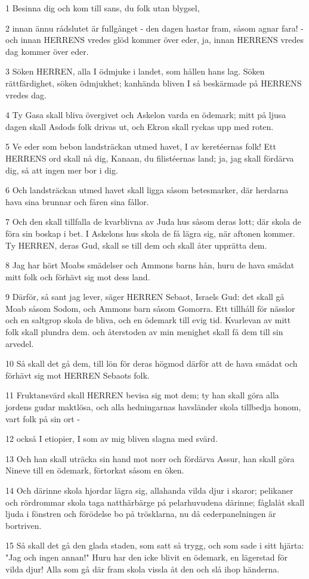 \par 1 Besinna dig och kom till sans, du folk utan blygsel,
\par 2 innan ännu rådslutet är fullgånget - den dagen hastar fram, såsom agnar fara! - och innan HERRENS vredes glöd kommer över eder, ja, innan HERRENS vredes dag kommer över eder.
\par 3 Söken HERREN, alla I ödmjuke i landet, som hållen hans lag. Söken rättfärdighet, söken ödmjukhet; kanhända bliven I så beskärmade på HERRENS vredes dag.
\par 4 Ty Gasa skall bliva övergivet och Askelon varda en ödemark; mitt på ljusa dagen skall Asdods folk drivas ut, och Ekron skall ryckas upp med roten.
\par 5 Ve eder som bebon landsträckan utmed havet, I av keretéernas folk! Ett HERRENS ord skall nå dig, Kanaan, du filistéernas land; ja, jag skall fördärva dig, så att ingen mer bor i dig.
\par 6 Och landsträckan utmed havet skall ligga såsom betesmarker, där herdarna hava sina brunnar och fåren sina fållor.
\par 7 Och den skall tillfalla de kvarblivna av Juda hus såsom deras lott; där skola de föra sin boskap i bet. I Askelons hus skola de få lägra sig, när aftonen kommer. Ty HERREN, deras Gud, skall se till dem och skall åter upprätta dem.
\par 8 Jag har hört Moabs smädelser och Ammons barns hån, huru de hava smädat mitt folk och förhävt sig mot dess land.
\par 9 Därför, så sant jag lever, säger HERREN Sebaot, Israels Gud: det skall gå Moab såsom Sodom, och Ammons barn såsom Gomorra. Ett tillhåll för nässlor och en saltgrop skola de bliva, och en ödemark till evig tid. Kvarlevan av mitt folk skall plundra dem. och återstoden av min menighet skall få dem till sin arvedel.
\par 10 Så skall det gå dem, till lön för deras högmod därför att de hava smädat och förhävt sig mot HERREN Sebaots folk.
\par 11 Fruktansvärd skall HERREN bevisa sig mot dem; ty han skall göra alla jordens gudar maktlösa, och alla hedningarnas havsländer skola tillbedja honom, vart folk på sin ort -
\par 12 också I etiopier, I som av mig bliven slagna med svärd.
\par 13 Och han skall uträcka sin hand mot norr och fördärva Assur, han skall göra Nineve till en ödemark, förtorkat såsom en öken.
\par 14 Och därinne skola hjordar lägra sig, allahanda vilda djur i skaror; pelikaner och rördrommar skola taga natthärbärge på pelarhuvudena därinne; fåglalåt skall ljuda i fönstren och förödelse bo på trösklarna, nu då cederpanelningen är bortriven.
\par 15 Så skall det gå den glada staden, som satt så trygg, och som sade i sitt hjärta: "Jag och ingen annan!" Huru har den icke blivit en ödemark, en lägerstad för vilda djur! Alla som gå där fram skola vissla åt den och slå ihop händerna.

